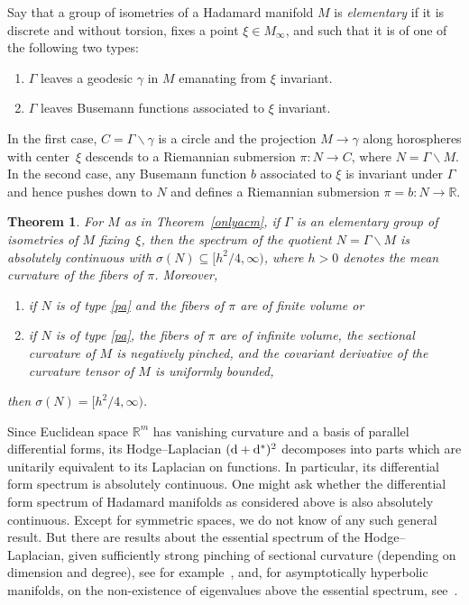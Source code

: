 \documentclass[pdftex]{sigma}
\numberwithin{equation}{section}
\newtheorem{Theorem}{Theorem}[section]
\def\R{\mathbb R}
\begin{document}
Say that a group of isometries of a Hadamard manifold $M$ is \emph{elementary}
if it is discrete and without torsion, fixes a point $\xi\in M_\infty$,
and such that it is of one of the following two types:
\begin{enumerate}[label=(\alph*)]\itemsep=0pt
\item\label{ax} $\Gamma$ leaves a geodesic $\gamma$ in $M$ emanating from $\xi$ invariant.
\item\label{pa} $\Gamma$ leaves Busemann functions associated to $\xi$ invariant.
\end{enumerate}
In the first case, $C=\Gamma\backslash\gamma$ is a circle and the projection $M\to\gamma$
along horospheres with center~$\xi$ descends to a Riemannian submersion $\pi\colon N\to C$,
where $N=\Gamma\backslash M$.
In the second case,
any Busemann function $b$ associated to $\xi$ is invariant under $\Gamma$
and hence pushes down to $N$ and defines a Riemannian submersion $\pi=b\colon N\to\R$.

\begin{Theorem}\label{onlyacn}
For $M$ as in Theorem~{\rm \ref{onlyacm}}, if $\Gamma$ is an elementary group of isometries of $M$ fixing~$\xi$,
then the spectrum of the quotient $N=\Gamma\backslash M$ is absolutely continuous
with $\sigma(N)\subseteq\bigl[h^2/4,\infty\bigr)$, where $h>0$ denotes the mean curvature of the fibers of $\pi$.
Moreover,
\begin{enumerate}[label={\rm (\arabic*)}]\itemsep=0pt
\item
if $N$ is of type {\rm \ref{pa}} and the fibers of $\pi$ are of finite volume or
\item
if $N$ is of type {\rm \ref{pa}}, the fibers of $\pi$ are of infinite volume,
the sectional curvature of $M$ is negatively pinched,
and the covariant derivative of the curvature tensor of $M$ is uniformly bounded,
\end{enumerate}
then $\sigma(N)=\bigl[h^2/4,\infty\bigr)$.
\end{Theorem}

Since Euclidean space $\R^m$ has vanishing curvature and a basis of parallel differential forms,
its Hodge--Laplacian $({\rm d}+{\rm d}^*)^2$ decomposes into parts which are unitarily equivalent to its Laplacian on functions.
In particular, its differential form spectrum is absolutely continuous.
One might ask whether the differential form spectrum of Hadamard manifolds as considered above
is also absolutely continuous.
Except for symmetric spaces,
we do not know of any such general result.
But there are results about the essential spectrum of the Hodge--Laplacian,
given sufficiently strong pinching of sectional curvature (depending on dimension and degree),
see for ex\-am\-ple~\cite{DX84,Kas94},
and, for asymptotically hyperbolic manifolds, on the non-existence of eigenvalues
above the essential spectrum, see~\cite[Theorem 16]{Ma91}.
\end{document}
